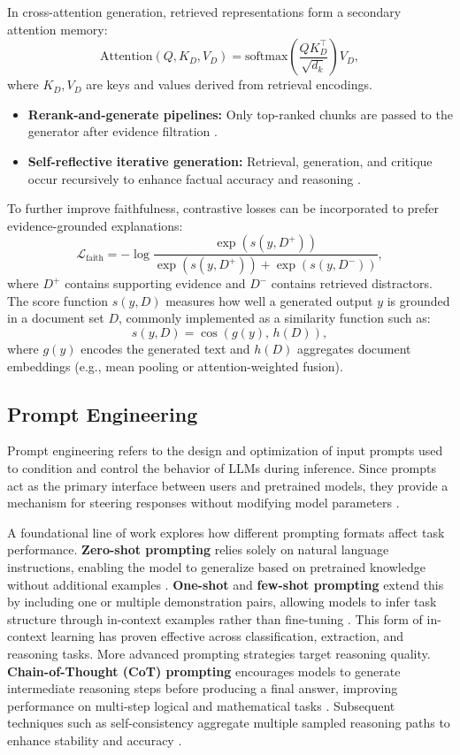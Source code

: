 In cross-attention generation, retrieved representations form a secondary attention memory:
\[
\text{Attention}(Q, K_D, V_D) = \text{softmax}\left(\frac{QK_D^\top}{\sqrt{d_k}}\right)V_D,
\]
where $K_D, V_D$ are keys and values derived from retrieval encodings.

\begin{itemize}
    \item \textbf{Rerank-and-generate pipelines:} Only top-ranked chunks are passed to the generator after evidence filtration \cite{zhang2024llm_hallucination_code}.
    \item \textbf{Self-reflective iterative generation:} Retrieval, generation, and critique occur recursively to enhance factual accuracy and reasoning \cite{asai2023selfrag}.
\end{itemize}

To further improve faithfulness, contrastive losses can be incorporated to prefer evidence-grounded explanations:
\[
\mathcal{L}_{\text{faith}} = -\log \frac{\exp(s(y, D^+))}{\exp(s(y, D^+)) + \exp(s(y, D^-))},
\]
where $D^+$ contains supporting evidence and $D^-$ contains retrieved distractors. The score function $s(y, D)$ measures how well a generated output $y$ is grounded in a document set $D$, commonly implemented as a similarity function such as:
\[
s(y, D) = \cos\left(g(y), \, h(D)\right),
\]
where $g(y)$ encodes the generated text and $h(D)$ aggregates document embeddings (e.g., mean pooling or attention-weighted fusion).

\subsection{Prompt Engineering}

Prompt engineering refers to the design and optimization of input prompts used to condition and control the behavior of LLMs during inference. Since prompts act as the primary interface between users and pretrained models, they provide a mechanism for steering responses without modifying model parameters \cite{brown2020language}.

A foundational line of work explores how different prompting formats affect task performance. \textbf{Zero-shot prompting} relies solely on natural language instructions, enabling the model to generalize based on pretrained knowledge without additional examples \cite{reynolds2021prompt}. \textbf{One-shot} and \textbf{few-shot prompting} extend this by including one or multiple demonstration pairs, allowing models to infer task structure through in-context examples rather than fine-tuning \cite{brown2020language}. This form of in-context learning has proven effective across classification, extraction, and reasoning tasks.
More advanced prompting strategies target reasoning quality. \textbf{Chain-of-Thought (CoT) prompting} encourages models to generate intermediate reasoning steps before producing a final answer, improving performance on multi-step logical and mathematical tasks \cite{wei2022cot}. Subsequent techniques such as self-consistency aggregate multiple sampled reasoning paths to enhance stability and accuracy \cite{wang2023selfconsistency}.

